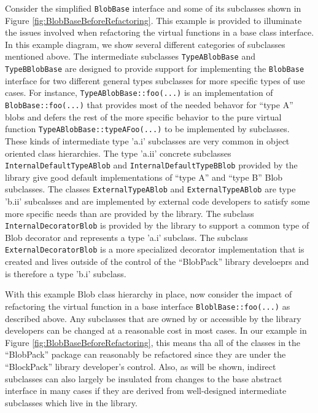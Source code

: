 \documentclass[pdf,ps2pdf,11pt]{SANDreport}
\begin{document}
Consider the simplified {}\texttt{Blob\-Base} interface and some of its
subclasses shown in Figure {}\ref{fig:BlobBaseBeforeRefactoring}.  This
example is provided to illuminate the issues involved when refactoring the
virtual functions in a base class interface.  In this example diagram, we show
several different categories of subclasses mentioned above.  The intermediate
subclasses {}\texttt{Type\-A\-Blob\-Base} and {}\texttt{Type\-B\-Blob\-Base}
are designed to provide support for implementing the {}\texttt{Blob\-Base}
interface for two different general types subclasses for more specific types
of use cases.  For instance, {}\texttt{Type\-A\-Blob\-Base\-::foo(...)} is an
implementation of {}\texttt{Blob\-Base\-::foo(...)} that provides most of the
needed behavor for ``type A'' blobs and defers the rest of the more specific
behavior to the pure virtual function
{}\texttt{Type\-A\-Blob\-Base\-::typeAFoo(...)} to be implemented by
subclasses.  These kinds of intermediate type 'a.i' subclasses are very common
in object oriented class hierarchies.  The type 'a.ii' concrete subclasses
{}\texttt{Internal\-Default\-Type\-A\-Blob} and
{}\texttt{Internal\-Default\-Type\-B\-Blob} provided by the library give good
default implementations of ``type A'' and ``type B'' Blob subclasses.  The
classes {}\texttt{External\-Type\-A\-Blob} and
{}\texttt{External\-Type\-A\-Blob} are type 'b.ii' subcalsses and are
implemented by external code developers to satisfy some more specific needs
than are provided by the library.  The subclass
{}\texttt{Internal\-Decorator\-Blob} is provided by the library to support a
common type of Blob decorator and represents a type 'a.i' subclass.  The
subclass {}\texttt{External\-Decorator\-Blob} is a more specialized decorator
implementation that is created and lives outside of the control of the
``BlobPack'' library develoeprs and is therefore a type 'b.i' subclass.

With this example Blob class hierarchy in place, now consider the impact of
refactoring the virtual function in a base interface
{}\texttt{Blobl\-Base\-::foo(...)} as described above.  Any subclasses that
are owned by or accessible by the library developers can be changed at a
reasonable cost in most cases.  In our example in Figure
{}\ref{fig:BlobBaseBeforeRefactoring}, this means tha all of the classes in
the ``BlobPack'' package can reasonably be refactored since they are under the
``BlockPack'' library developer's control.  Also, as will be shown, indirect
subclasses can also largely be insulated from changes to the base abstract
interface in many cases if they are derived from well-designed intermediate
subclasses which live in the library.
\end{document}
